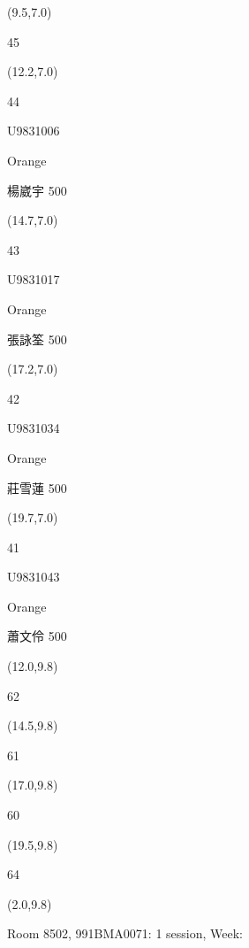 \documentclass[a4paper]{article}
\newcommand{\myseat}[5]{%
\vspace{-0.1cm} \hspace{-0.5cm}
\parbox[t][2.2cm][t]{3.5cm}{%
\small #1 %
\begin{description}
\vspace{-0.1cm}
\item [ID:] #2
\vspace{-0.1cm}
\item [Team:] #3 \normalsize
\vspace{-0.1cm}
\item \normalsize #4 #5
\vspace{-0.1cm}
\end{description}
}
}
\begin{document}
\begin{CJK}{UTF8}{cyberbit}
\begin{textblock}{2.5}(9.5,7.0)
\textblockcolor{}
\myseat{45}{}{}{}{}
\end{textblock}

\begin{textblock}{2.5}(12.2,7.0)
\myseat{44}{U9831006}{Orange}{楊崴宇}{500}
\end{textblock}

\begin{textblock}{2.5}(14.7,7.0)
\myseat{43}{U9831017}{Orange}{張詠筌}{500}
\end{textblock}

\begin{textblock}{2.5}(17.2,7.0)
\myseat{42}{U9831034}{Orange}{莊雪蓮}{500}
\end{textblock}

\begin{textblock}{2.5}(19.7,7.0)
\myseat{41}{U9831043}{Orange}{蕭文伶}{500}
\end{textblock}




\begin{textblock}{2.5}(12.0,9.8)
\textblockcolor{}
\myseat{62}{}{}{}{}
\end{textblock}

\begin{textblock}{2.5}(14.5,9.8)
\textblockcolor{}
\myseat{61}{}{}{}{}
\end{textblock}

\begin{textblock}{2.5}(17.0,9.8)
\textblockcolor{}
\myseat{60}{}{}{}{}
\end{textblock}

\begin{textblock}{2.5}(19.5,9.8)
\textblockcolor{}
\myseat{64}{}{}{}{}
\end{textblock}

\begin{textblock}{10}(2.0,9.8)
\textblockcolor{}
\parbox[t][2.2cm][t]{9.5cm}{%
\large Room 8502, 991BMA0071: 1 session, Week: 
\vspace{-0.3cm} \hspace{-0.5cm}
}
\end{textblock}

\end{CJK}
\end{document}
